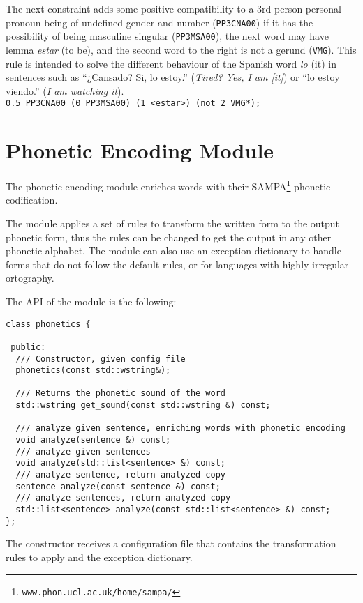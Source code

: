 \documentclass[a4paper]{book}
\begin{document}
	The next constraint adds some positive compatibility to a
	3rd person personal pronoun being of undefined gender and
	number ({\tt PP3CNA00}) if it has the possibility of being
        masculine singular ({\tt PP3MSA00}), the next word may have
        lemma {\sl estar} (to be), and the second word to the right
	is not a gerund ({\tt VMG}). This rule is intended to solve the 
        different behaviour of the Spanish word {\sl lo} (it) in sentences 
        such as ``¿Cansado? Si, lo estoy.'' ({\sl Tired? Yes, I am [it]}) or 
        ``lo estoy viendo.'' ({\sl I am watching it}).\\
	{\tt 0.5 PP3CNA00 (0 PP3MSA00) (1 \verb#<estar>#) (not 2 VMG*);}


\section{Phonetic Encoding Module}
\label{file-phon}

 The phonetic encoding module enriches words with their SAMPA\footnote{\texttt{www.phon.ucl.ac.uk/home/sampa/}} phonetic codification.

 The module applies a set of rules to transform the written form to
 the output phonetic form, thus the rules can be changed to get the
 output in any other phonetic alphabet. The module can also use an
 exception dictionary to handle forms that do not follow the default
 rules, or for languages with highly irregular ortography.

 The API of the module is the following:

\begin{verbatim}
class phonetics {
  
 public:
  /// Constructor, given config file
  phonetics(const std::wstring&);
  
  /// Returns the phonetic sound of the word
  std::wstring get_sound(const std::wstring &) const;

  /// analyze given sentence, enriching words with phonetic encoding
  void analyze(sentence &) const;
  /// analyze given sentences
  void analyze(std::list<sentence> &) const;
  /// analyze sentence, return analyzed copy
  sentence analyze(const sentence &) const;
  /// analyze sentences, return analyzed copy
  std::list<sentence> analyze(const std::list<sentence> &) const;
};

\end{verbatim}

 The constructor receives a configuration file that contains the
 transformation rules to apply and the exception dictionary.
\end{document}
